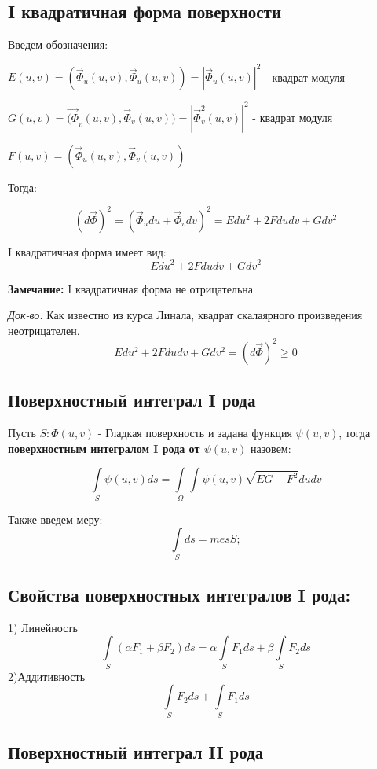 \documentclass[12pt]{article}
\begin{document}
\subsection{I квадратичная форма поверхности}
	
	Введем обозначения:
		
	$E(u , v) = (\vec{\Phi}_u(u , v) , \vec{\Phi}_u( u, v)) = |\vec{\Phi}_u( u, v)|^2$ - квадрат модуля
	
	$G(u , v) = \vec{(\Phi}_v(u , v) , \vec{\Phi}_v( u, v)) = |\vec{\Phi}_v^2( u, v)|^2$ - квадрат модуля
	
	$F(u , v) = (\vec{\Phi}_u(u , v) , \vec{\Phi}_v( u, v))$ 
	
	Тогда:
	
	$$(d\vec{\Phi})^2 = (\vec{\Phi}_u du + \vec{\Phi}_v dv)^2 = Edu^2 + 2Fdudv + Gdv^2$$
	
	I квадратичная форма имеет вид:
	$$Edu^2 + 2Fdudv + Gdv^2$$			
	
\textbf{Замечание:}
	I квадратичная форма не отрицательна
	
\textit{Док-во:}
Как известно из курса Линала, квадрат скалаярного произведения неотрицателен.
	$$Edu^2 + 2Fdudv + Gdv^2 = (d\vec{\Phi})^2 \geqslant 0$$
	
\subsection{Поверхностный интеграл I рода}
	Пусть $S : \Phi(u , v)$ - Гладкая поверхность и задана функция $\psi(u , v)$, тогда \textbf{поверхностным интегралом I рода от $\psi(u,v)$} назовем:
	
$$
\int\limits_{S} \psi(u , v) ds 
=
\int\limits_{\Omega}\int \psi(u,v)\sqrt{EG - F^2}dudv	
$$		
	
	Также введем меру:
$$
	\int\limits_{S}ds = mesS;
$$	
	
\subsection{Свойства поверхностных интегралов I рода:}
	1) Линейность
$$
\int\limits_{S} (\alpha F_1 + \beta F_2)ds
=
\alpha\int\limits_{S}  F_1ds
+
\beta\int\limits_{S}  F_2ds
$$
	2)Аддитивность	
$$
\int\limits_{S}  F_2ds
+
\int\limits_{S}  F_1ds
$$



\subsection{Поверхностный интеграл II рода}
\end{document}
